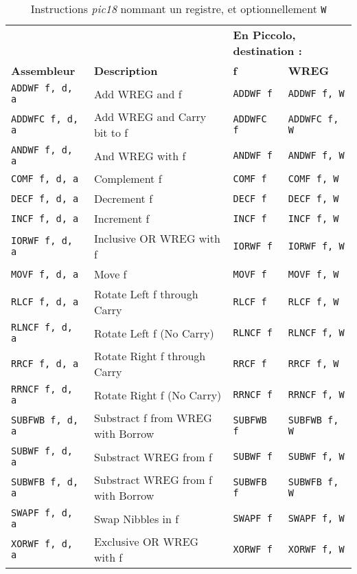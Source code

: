 \begin{table}[!ht]
  \centering
  \small
  \begin{tabular}{llll}
     &  & \multicolumn{2}{l}{\textbf{En Piccolo, destination :}} \\
    \textbf{Assembleur} & \textbf{Description} & \textbf{f} & \textbf{WREG}\\
    \hline
    \texttt{ADDWF f, d, a} & Add WREG and f & \texttt{ADDWF f}  & \texttt{ADDWF f, W} \\
    \texttt{ADDWFC f, d, a} & Add WREG and Carry bit to f & \texttt{ADDWFC f} & \texttt{ADDWFC f, W}\\
    \texttt{ANDWF f, d, a} & And WREG with f & \texttt{ANDWF f} & \texttt{ANDWF f, W}\\
    \texttt{COMF f, d, a} & Complement f & \texttt{COMF f} & \texttt{COMF f, W}\\
    \texttt{DECF f, d, a} & Decrement f & \texttt{DECF f} & \texttt{DECF f, W}\\
    \texttt{INCF f, d, a} & Increment f & \texttt{INCF f}& \texttt{INCF f, W}\\
    \texttt{IORWF f, d, a} & Inclusive OR WREG with f & \texttt{IORWF f} & \texttt{IORWF f, W}\\
    \texttt{MOVF f, d, a} & Move f & \texttt{MOVF f} & \texttt{MOVF f, W}\\
    \texttt{RLCF f, d, a} & Rotate Left f through Carry & \texttt{RLCF f} & \texttt{RLCF f, W}\\
    \texttt{RLNCF f, d, a} & Rotate Left f (No Carry) & \texttt{RLNCF f} & \texttt{RLNCF f, W}\\
    \texttt{RRCF f, d, a} & Rotate Right f through Carry & \texttt{RRCF f} & \texttt{RRCF f, W}\\
    \texttt{RRNCF f, d, a} & Rotate Right f (No Carry) & \texttt{RRNCF f} & \texttt{RRNCF f, W}\\
    \texttt{SUBFWB f, d, a} & Substract f from WREG with Borrow & \texttt{SUBFWB f} & \texttt{SUBFWB f, W}\\
    \texttt{SUBWF f, d, a} & Substract WREG from f & \texttt{SUBWF f} & \texttt{SUBWF f, W}\\
    \texttt{SUBWFB f, d, a} & Substract WREG from f with Borrow & \texttt{SUBWFB f} & \texttt{SUBWFB f, W}\\
    \texttt{SWAPF f, d, a} & Swap Nibbles in f & \texttt{SWAPF f} & \texttt{SWAPF f, W}\\
    \texttt{XORWF f, d, a} & Exclusive OR WREG with f & \texttt{XORWF f} & \texttt{XORWF f, W}\\
  \hline
  \end{tabular}
  \caption{Instructions \emph{pic18} nommant un registre, et optionnellement \texttt{W}}
\end{table}


